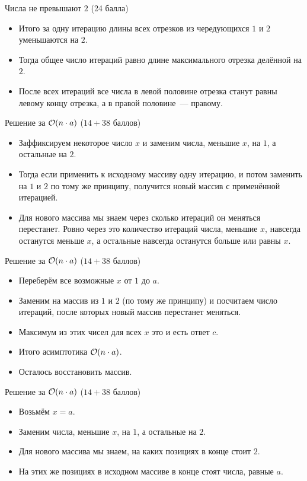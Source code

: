 \begin{frame}{Числа не превышают $2$ (24 балла)}
  \begin{itemize}
  \item Итого за одну итерацию длины всех отрезков из чередующихся $1$ и $2$ уменьшаются на $2$.
  \item Тогда общее число итераций равно длине максимального отрезка делённой на $2$.
  \item После всех итераций все числа в левой половине отрезка станут равны левому концу отрезка, а в правой половине~--- правому.
  \end{itemize}
\end{frame}

\begin{frame}{Решение за $\mathcal{O}(n \cdot a)$ ($14 + 38$ баллов)}
  \begin{itemize}
  \item Заффиксируем некоторое число $x$ и заменим числа, меньшие $x$, на $1$, а остальные на $2$.
  \item Тогда если применить к исходному массиву одну итерацию, и потом заменить на $1$ и $2$ по тому же принципу, получится новый массив с применённой итерацией.
  \item Для нового массива мы знаем через сколько итераций он меняться перестанет. Ровно через это количество итераций числа, меньшие $x$, навсегда останутся меньше $x$, а остальные навсегда останутся больше или равны $x$.
  \end{itemize}
\end{frame}

\begin{frame}{Решение за $\mathcal{O}(n \cdot a)$ ($14 + 38$ баллов)}
  \begin{itemize}
  \item Переберём все возможные $x$ от $1$ до $a$.
  \item Заменим на массив из $1$ и $2$ (по тому же принципу) и посчитаем число итераций, после которых новый массив перестанет меняться.
  \item Максимум из этих чисел для всех $x$ это и есть ответ $c$.
  \item Итого асимптотика $\mathcal{O}(n \cdot a)$.
  \item Осталось восстановить массив.
  \end{itemize}
\end{frame}

\begin{frame}{Решение за $\mathcal{O}(n \cdot a)$ ($14 + 38$ баллов)}
  \begin{itemize}
  \item Возьмём $x = a$.
  \item Заменим числа, меньшие $x$, на $1$, а остальные на $2$.
  \item Для нового массива мы знаем, на каких позициях в конце стоит $2$.
  \item На этих же позициях в исходном массиве в конце стоят числа, равные $a$.
  \end{itemize}
\end{frame}

